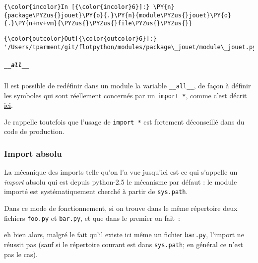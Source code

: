     \begin{Verbatim}[commandchars=\\\{\},frame=single,framerule=0.3mm,rulecolor=\color{cellframecolor}]
{\color{incolor}In [{\color{incolor}6}]:} \PY{n}{package\PYZus{}jouet}\PY{o}{.}\PY{n}{module\PYZus{}jouet}\PY{o}{.}\PY{n+nv+vm}{\PYZus{}\PYZus{}file\PYZus{}\PYZus{}}
\end{Verbatim}


\begin{Verbatim}[commandchars=\\\{\},frame=single,framerule=0.3mm,rulecolor=\color{cellframecolor}]
{\color{outcolor}Out[{\color{outcolor}6}]:} '/Users/tparment/git/flotpython/modules/package\_jouet/module\_jouet.py'
\end{Verbatim}
            
    \hypertarget{all__}{%
\subparagraph{\texorpdfstring{\texttt{\_\_all\_\_}}{\_\_all\_\_}}\label{all__}}

    Il est possible de redéfinir dans un module la variable
\texttt{\_\_all\_\_}, de façon à définir les symboles qui sont
réellement concernés par un \texttt{import\ *},
\href{https://docs.python.org/3/tutorial/modules.html\#importing-from-a-package}{comme
c'est décrit ici}.

Je rappelle toutefois que l'usage de \texttt{import\ *} est fortement
déconseillé dans du code de production.

    \hypertarget{import-absolu}{%
\subsubsection{Import absolu}\label{import-absolu}}

    La mécanique des imports telle qu'on l'a vue jusqu'ici est ce qui
s'appelle un \emph{import} absolu qui est depuis python-2.5 le mécanisme
par défaut : le module importé est systématiquement cherché à partir de
\texttt{sys.path}.

Dans ce mode de fonctionnement, si on trouve dans le même répertoire
deux fichiers \texttt{foo.py} et \texttt{bar.py}, et que dans le premier
on fait~:

\begin{Shaded}
\begin{Highlighting}[frame=lines,framerule=0.6mm,rulecolor=\color{asisframecolor}]
\end{Highlighting}
\end{Shaded}

eh bien alors, malgré le fait qu'il existe ici même un fichier
\texttt{bar.py}, l'import ne réussit pas (sauf si le répertoire courant
est dans \texttt{sys.path}; en général ce n'est pas le cas).

